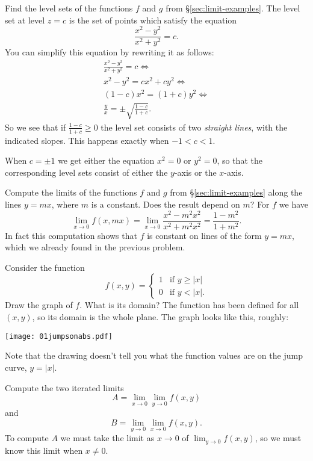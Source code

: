 \begin{multicols}{2}\problemfont

\problem Find the level sets of the functions $f$ and $g$ from%
\S\ref{sec:limit-examples}.
\answer%
The level set at level $z=c$ is the set of points which satisfy
the equation
\[
\frac{x^2-y^2} {x^2+y^2} = c.
\]
You can simplify this equation by rewriting it as follows:
\begin{multline*}
  \frac{x^2-y^2} {x^2+y^2} = c \iff\\
  x^2-y^2 = cx^2+cy^2 \iff\\
  (1-c)x^2 = (1+c)y^2 \iff\\
  \frac{y} {x} = \pm\sqrt{\frac{1-c} {1+c}}.
\end{multline*}
So we see that if $\frac{1-c} {1+c}\geq0$ the level set
consists of two \emph{straight lines}, with the indicated slopes.
This happens exactly when $-1<c<1$.

When $c=\pm1$ we get either the equation $x^2=0$ or $y^2=0$, so
that the corresponding level sets consist of either the $y$-axis
or the $x$-axis.
\endanswer


\problem  Compute the limits of the functions $f$ and $g$ from%
\S\ref{sec:limit-examples} along the lines $y=mx$, where $m$ is a
constant. Does the result depend on $m$?
\answer%
For $f$ we have
\[
\lim_{x\to0}f(x, mx) = \lim_{x\to 0}\frac{x^2-m^2x^2} {x^2+m^2x^2}
=\frac{1-m^2} {1+m^2}.
\]
In fact this computation shows that $f$ is constant on lines
of the form $y=mx$, which we already found in the previous problem.
\endanswer


\problem
\label{prb:stepfunction}
Consider the function
\[
f(x, y) =
\begin{cases}
  1 & \text{if $y\geq |x|$} \\
  0 & \text{if $y<|x|$}.
\end{cases}
\]
\subprob Draw the graph of $f$.  What is its domain?
\answer%
The function has been defined for all $(x,y)$, so
its domain is the whole plane.  The graph looks like this, roughly:

\begin{center}
    \texttt{[image: 01jumpsonabs.pdf]}
\end{center}

Note that the drawing doesn't tell you what the function values
are on the jump curve, $y=|x|$.
\endanswer


\subprob Compute the two iterated limits
\[
A=\lim_{x\to0}\lim_{y\to0} f(x, y)
\]
and
\[
B=\lim_{y\to0}\lim_{x\to0} f(x, y).
\]
\answer%
To compute $A$ we must take the limit as $x\to 0$ of $\lim_{y\to 0}f(x, y)$,
so we must know this limit when $x\neq 0$.


\end{multicols}
